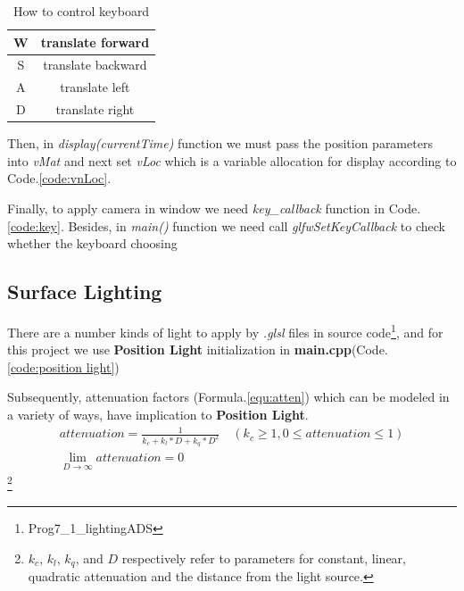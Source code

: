 \documentclass[12pt]{article}
\numberwithin{figure}{subsection}
\numberwithin{table}{subsection}
\numberwithin{equation}{subsection}
\begin{document}
\begin{table}[!hpbt]
    \centering
    \begin{tabular}{|c|c|}
    \hline
    W & translate forward \\ \hline
    S & translate backward \\ \hline   
    A & translate left  \\ \hline
    D & translate right\\ \hline                    
    \end{tabular}
    \caption{How to control keyboard}
    \label{tab:keyboard}
\end{table}

Then, in \emph{display(currentTime)} function we must pass the 
position parameters into \emph{vMat} and next set \emph{vLoc} 
which is a variable allocation for display according to Code.\ref{code:vnLoc}.
\label{code:vnLoc}



Finally, to apply camera in window we need \emph{key\_callback} function in Code.\ref{code:key}. Besides, 
in \emph{main()} function we need call \emph{glfwSetKeyCallback} to check whether the keyboard choosing 
\label{code:key}



\subsection{Surface Lighting}
There are a number kinds of light to apply by \emph{.glsl} files in source code\footnote{Prog7\_1\_lightingADS},
and for this project we use \textbf{Position Light} initialization in \textbf{main.cpp}(Code.\ref{code:position light})
\label{code:position light}


Subsequently, attenuation factors (Formula.\ref{equ:atten}) which can be modeled in a variety of ways,
have implication to \textbf{Position Light}. 
\begin{eqnarray}\label{equ:atten}　
    attenuation=\frac{1}{k_c+k_l*D+k_q*D^2}\quad(k_c\geqslant1,0\leqslant attenuation\leqslant1)\\
    \lim_{D\to \infty}attenuation=0
\end{eqnarray}
\footnote{$k_c$, $k_l$, $k_q$, and $D$ respectively refer to parameters for constant, linear, quadratic
attenuation and the distance from the light source.}
\end{document}
